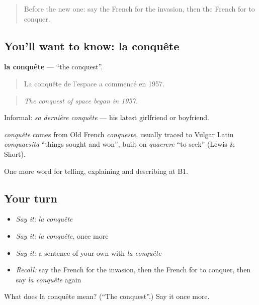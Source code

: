 \begin{quote}
Before the new one: say the French for the invasion, then the French for to conquer.
\end{quote}

\subsection*{You'll want to know: la conquête}
\textbf{la conquête} — \textquotedblleft{}the conquest\textquotedblright{}.

\begin{quote}
La conquête de l'espace a commencé en 1957.
\end{quote}

\begin{quote}
\emph{The conquest of space began in 1957.}
\end{quote}

Informal: \emph{sa dernière conquête} — his latest girlfriend or boyfriend.

\begin{cousinweb}
\emph{conquête} comes from Old French \emph{conqueste}, usually traced to Vulgar Latin \emph{conquaesita} \textquotedblleft{}things sought and won\textquotedblright{}, built on \emph{quaerere} \textquotedblleft{}to seek\textquotedblright{} (Lewis \& Short).
\end{cousinweb}

\begin{grammarlens}[title={What you've built}]
One more word for telling, explaining and describing at B1.
\end{grammarlens}

\subsection*{Your turn}
\begin{itemize}
\raggedright
  \item \emph{Say it:} \emph{la conquête}
  \item \emph{Say it:} \emph{la conquête}, once more
  \item \emph{Say it:} a sentence of your own with \emph{la conquête}
  \item \emph{Recall:} say the French for the invasion, then the French for to conquer, then say \emph{la conquête} again
\end{itemize}

\begin{tcolorbox}[breakable,colback=teal!4,colframe=teal!35!black,title={Before you move on}]
What does la conquête mean? (\textquotedblleft{}The conquest\textquotedblright{}.) Say it once more.
\end{tcolorbox}
